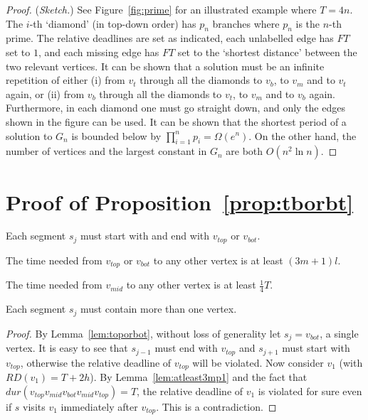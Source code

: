 \documentclass[envcountsame]{llncs}
\begin{document}
\begin{proof}
(\emph{Sketch.}) See Figure~\ref{fig:prime} for an illustrated example where $T = 4n$.
The $i$-th `diamond' (in top-down order) has $p_n$ branches where $p_n$ is the $n$-th prime.
The relative deadlines are set as indicated, each unlabelled edge has $FT$ set to $1$, and
each missing edge has $FT$ set to the `shortest distance' between the two relevant vertices.
It can be shown that a solution must be an infinite repetition of either (i) from $v_t$ through all the diamonds to $v_b$, to
$v_m$ and to $v_t$ again, or (ii) from $v_b$ through all the diamonds to $v_t$, to $v_m$ and to $v_b$ again.
Furthermore, in each diamond one must go straight down, and only the edges shown in the figure can be used.
It can be shown that the shortest period of a solution to $G_n$ is bounded below by $\displaystyle{\prod_{i = 1}^n p_i} = \Omega(e^n)$.
On the other hand, the number of vertices and the largest constant in $G_n$ are both $O(n^2 \ln n)$.
\end{proof}


\section{Proof of Proposition~\ref{prop:tborbt}}\label{app:tborbt}

\begin{lemma}\label{lem:toporbot}
Each segment $s_j$ must start with and end with $v_{top}$ or $v_{bot}$.
\end{lemma}


\begin{lemma}\label{lem:atleast3mp1}
The time needed from $v_{top}$ or $v_{bot}$ to any other vertex is at least $(3m + 1)l$.
\end{lemma}


\begin{lemma}\label{lem:atleast14t}
The time needed from $v_{mid}$ to any other vertex is at least $\frac{1}{4}T$.
\end{lemma}


\begin{lemma}\label{lem:segmorethanone}
Each segment $s_j$ must contain more than one vertex.
\end{lemma}
\begin{proof}
By Lemma~\ref{lem:toporbot}, without loss of generality let $s_j = v_{bot}$, a single vertex. It is easy to see
that $s_{j-1}$ must end with $v_{top}$ and $s_{j+1}$ must start with $v_{top}$, otherwise
the relative deadline of $v_{top}$ will be violated. Now consider $v_1$ (with $\mathit{RD}(v_1) = T + 2h$).
By Lemma~\ref{lem:atleast3mp1} and the fact that $\mathit{dur}(v_{top} v_{mid} v_{bot} v_{mid} v_{top}) = T$,
the relative deadline of $v_1$ is violated for sure even if $s$ visits $v_1$
immediately after $v_{top}$. This is a contradiction.
\end{proof}
\end{document}
